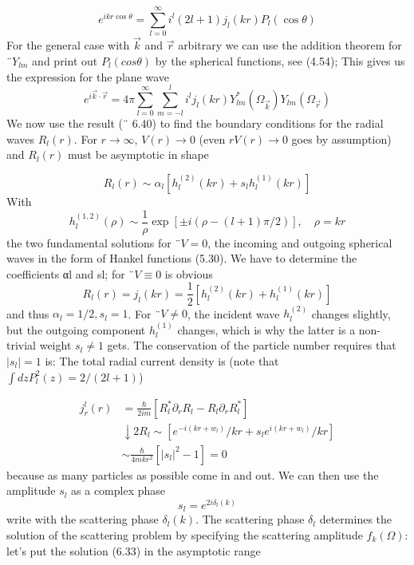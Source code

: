 %
\begin{equation}
    e^{i k r \cos \theta}=\sum_{l=0}^{\infty} i^{l}(2 l+1) j_{l}(k r) P_{l}(\cos \theta)
    \end{equation}
For the general case with $\vec{k}$ and $\vec{r}$ arbitrary we can use the addition theorem for $¨ Y_{lm}$ and print out $P_l (cos \theta)$ by the spherical functions, see (4.54); This gives us the expression for the plane wave
\begin{equation}
    e^{i \vec{k} \cdot \vec{r}}=4 \pi \sum_{l=0}^{\infty} \sum_{m=-l}^{l} i^{l} j_{l}(k r) Y_{l m}^{*}\left(\Omega_{\vec{k}}\right) Y_{l m}\left(\Omega_{\vec{r}}\right)
    \end{equation}
We now use the result (¨ 6.40) to find the boundary conditions for the radial waves $R_l (r)$. For $r \rightarrow\infty$, $V (r) \rightarrow 0$ (even $rV (r) \rightarrow 0$ goes by assumption) and $ R_l (r)$ must be asymptotic in shape

%
\begin{equation}
    R_{l}(r) \sim \alpha_{l}\left[h_{l}^{(2)}(k r)+s_{l} h_{l}^{(1)}(k r)\right]
    \end{equation}
With
\begin{equation}
    h_{l}^{(1,2)}(\rho) \sim \frac{1}{\rho} \exp [\pm i(\rho-(l+1) \pi / 2)], \quad \rho=k r
    \end{equation}
the two fundamental solutions for $¨V = 0$, the incoming and outgoing spherical waves in the form of Hankel functions (5.30). We have to determine the coefficients αl and sl; for ¨$V \equiv 0$ is obvious
\begin{equation}
    R_{l}(r)=j_{l}(k r)=\frac{1}{2}\left[h_{l}^{(2)}(k r)+h_{l}^{(1)}(k r)\right]
    \end{equation}
and thus $\alpha_l = 1/2, s_l = 1$. For ¨$V \neq 0$, the incident wave $h_l^{(2)}$ changes slightly, but the outgoing component $h^{(1)}_l$ changes, which is why the latter is a non-trivial weight $s_l \neq 1$ gets. The conservation of the particle number requires that $| s_l | = 1$ is: The total radial current density is (note that $\int dzP^2_l (z) = 2 / (2l + 1)$)

\begin{equation}
\begin{aligned} j_{r}^{l}(r) &=\frac{\hbar}{2 i m}\left[R_{l}^{*} \partial_{r} R_{l}-R_{l} \partial_{r} R_{l}^{*}\right] \\ & \downarrow 2 R_{l} \sim\left[e^{-i\left(k r+w_{l}\right)} / k r+s_{l} e^{i\left(k r+w_{l}\right)} / k r\right] \\ & \sim \frac{\hbar}{4 m k r^{2}}\left[\left|s_{l}\right|^{2}-1\right]=0 \end{aligned}
\end{equation}
because as many particles as possible come in and out. We can then use the amplitude $s_l$ as a complex phase
%
\begin{equation}
    s_{l}=e^{2 i \delta_{l}(k)}
    \end{equation}
write with the scattering phase $\delta_l (k)$. The scattering phase $\delta_l$ determines the solution of the scattering problem by specifying the scattering amplitude $f_k (\Omega)$: let's put the solution (6.33) in the asymptotic range

